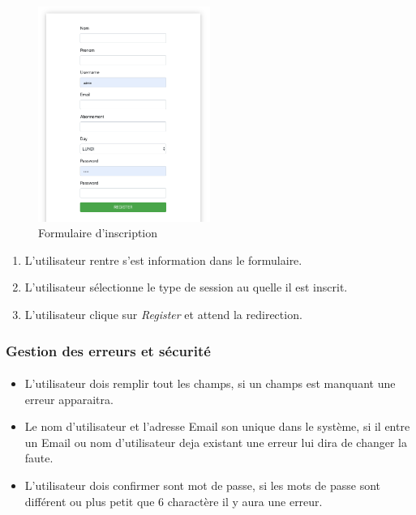 \begin{figure}[h]
	\includegraphics[width=0.5\textwidth,center]{Figures/us1-1}
	\caption{Formulaire d'inscription}
\end{figure}

\vspace{\baselineskip}
\begin{enumerate}
	\item L'utilisateur rentre s'est information dans le formulaire. 
	\item L'utilisateur sélectionne le type de session au quelle il est inscrit. 
	\item L'utilisateur clique sur \textit{Register} et attend la redirection. 
\end{enumerate}

\newpage
\subsubsection{Gestion des erreurs et sécurité}
	\paragraph{}
		\begin{itemize}
			\item L'utilisateur dois remplir tout les champs, si un champs est manquant une erreur apparaitra. 
			\item Le nom d'utilisateur et l'adresse Email son unique dans le système, si il entre un Email ou nom d'utilisateur deja existant une erreur lui dira de changer la faute.
			\item L'utilisateur dois confirmer sont mot de passe, si les mots de passe sont différent ou plus petit que 6 charactère il y aura une erreur.
		\end{itemize}
		
